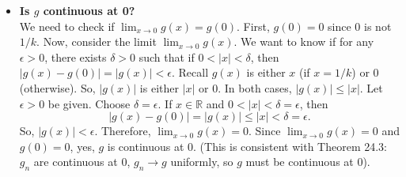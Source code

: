 \documentclass{article}
\newcommand{\R}{\mathbb{R}}
\begin{document}
\begin{enumerate}
\begin{itemize}
        \item \textbf{Is \(g\) continuous at 0?} \\
            We need to check if \(\lim_{x\to 0} g(x) = g(0)\).
            First, \(g(0) = 0\) since 0 is not \(1/k\).
            Now, consider the limit \(\lim_{x\to 0} g(x)\). We want to know if for any \(\epsilon > 0\), there exists \(\delta > 0\) such that if \(0 < |x| < \delta\), then \(|g(x) - g(0)| = |g(x)| < \epsilon\).
            Recall \(g(x)\) is either \(x\) (if \(x=1/k\)) or \(0\) (otherwise).
            So, \(|g(x)|\) is either \(|x|\) or \(0\). In both cases, \(|g(x)| \le |x|\).
            Let \(\epsilon > 0\) be given. Choose \(\delta = \epsilon\).
            If \(x \in \R\) and \(0 < |x| < \delta = \epsilon\), then
            \[ |g(x) - g(0)| = |g(x)| \le |x| < \delta = \epsilon. \]
            So, \(|g(x)| < \epsilon\).
            Therefore, \(\lim_{x\to 0} g(x) = 0\).
            Since \(\lim_{x\to 0} g(x) = 0\) and \(g(0) = 0\), yes, \(g\) is continuous at 0.
            (This is consistent with Theorem 24.3: \(g_n\) are continuous at 0, \(g_n \to g\) uniformly, so \(g\) must be continuous at 0).
    \end{itemize}
\end{enumerate}
\end{document}
